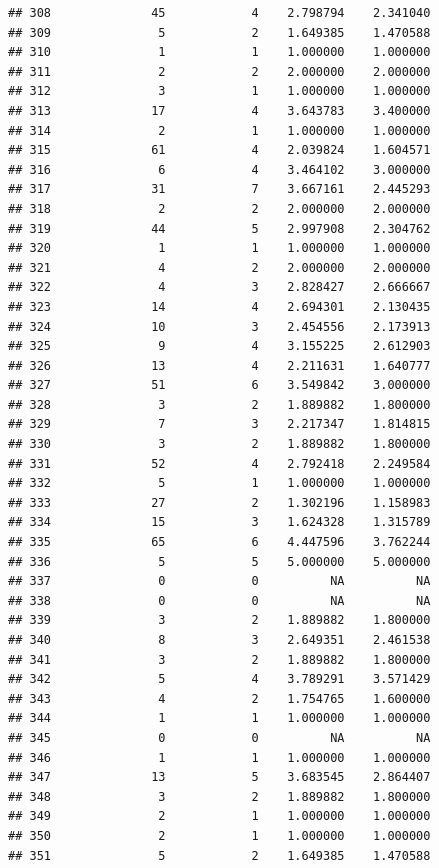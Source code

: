 \documentclass[
]{article}
\begin{document}
\begin{verbatim}
## 308              45            4    2.798794    2.341040
## 309               5            2    1.649385    1.470588
## 310               1            1    1.000000    1.000000
## 311               2            2    2.000000    2.000000
## 312               3            1    1.000000    1.000000
## 313              17            4    3.643783    3.400000
## 314               2            1    1.000000    1.000000
## 315              61            4    2.039824    1.604571
## 316               6            4    3.464102    3.000000
## 317              31            7    3.667161    2.445293
## 318               2            2    2.000000    2.000000
## 319              44            5    2.997908    2.304762
## 320               1            1    1.000000    1.000000
## 321               4            2    2.000000    2.000000
## 322               4            3    2.828427    2.666667
## 323              14            4    2.694301    2.130435
## 324              10            3    2.454556    2.173913
## 325               9            4    3.155225    2.612903
## 326              13            4    2.211631    1.640777
## 327              51            6    3.549842    3.000000
## 328               3            2    1.889882    1.800000
## 329               7            3    2.217347    1.814815
## 330               3            2    1.889882    1.800000
## 331              52            4    2.792418    2.249584
## 332               5            1    1.000000    1.000000
## 333              27            2    1.302196    1.158983
## 334              15            3    1.624328    1.315789
## 335              65            6    4.447596    3.762244
## 336               5            5    5.000000    5.000000
## 337               0            0          NA          NA
## 338               0            0          NA          NA
## 339               3            2    1.889882    1.800000
## 340               8            3    2.649351    2.461538
## 341               3            2    1.889882    1.800000
## 342               5            4    3.789291    3.571429
## 343               4            2    1.754765    1.600000
## 344               1            1    1.000000    1.000000
## 345               0            0          NA          NA
## 346               1            1    1.000000    1.000000
## 347              13            5    3.683545    2.864407
## 348               3            2    1.889882    1.800000
## 349               2            1    1.000000    1.000000
## 350               2            1    1.000000    1.000000
## 351               5            2    1.649385    1.470588

\end{verbatim}
\end{document}
